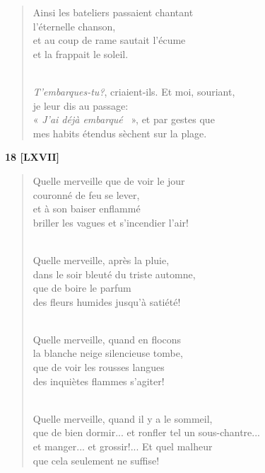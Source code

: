 \documentclass[a4paper,12pt]{book}
\begin{document}
\begin{verse}
Ainsi les bateliers passaient chantant \\
l'éternelle chanson, \\
et au coup de rame sautait l'écume \\
et la frappait le soleil. \\ \

{\em T'embarques-tu?}, criaient-ils. Et moi, souriant, \\
je leur dis au passage: \\
« {\em J'ai déjà embarqué} ~», et par gestes que \\
mes habits étendus sèchent sur la plage. \\
\end{verse}

\bigskip

\begin{center} {\bf 18 [LXVII]}  \end{center}

\begin{verse}
Quelle merveille que de voir le jour \\
couronné de feu se lever, \\
et à son baiser enflammé \\
briller les vagues et s'incendier l'air! \\ \

Quelle merveille, après la pluie, \\
dans le soir bleuté du triste automne, \\
que de boire le parfum \\
des fleurs humides jusqu'à satiété! \\ \

Quelle merveille, quand en flocons \\
la blanche neige silencieuse tombe, \\
que de voir les rousses langues \\
des inquiètes flammes s'agiter! \\ \

Quelle merveille, quand il y a le sommeil, \\
que de bien dormir... et ronfler tel un sous-chantre... \\
et manger... et grossir!... Et quel malheur \\
que cela seulement ne suffise! \\
\end{verse}
\end{document}
